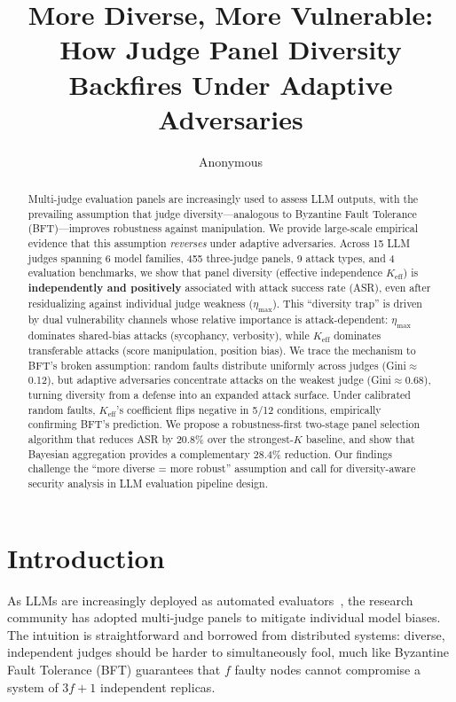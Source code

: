 \documentclass[11pt,a4paper]{article}
\title{More Diverse, More Vulnerable:\\How Judge Panel Diversity Backfires Under Adaptive Adversaries}
\author{Anonymous}
\newcommand{\keff}{K_{\text{eff}}}
\newcommand{\etamax}{\eta_{\text{max}}}
\begin{document}
\maketitle

\begin{abstract}
Multi-judge evaluation panels are increasingly used to assess LLM outputs, with the prevailing assumption that judge diversity---analogous to Byzantine Fault Tolerance (BFT)---improves robustness against manipulation. We provide large-scale empirical evidence that this assumption \emph{reverses} under adaptive adversaries. Across 15 LLM judges spanning 6 model families, 455 three-judge panels, 9 attack types, and 4 evaluation benchmarks, we show that panel diversity (effective independence $\keff$) is \textbf{independently and positively} associated with attack success rate (ASR), even after residualizing against individual judge weakness ($\etamax$). This ``diversity trap'' is driven by dual vulnerability channels whose relative importance is attack-dependent: $\etamax$ dominates shared-bias attacks (sycophancy, verbosity), while $\keff$ dominates transferable attacks (score manipulation, position bias). We trace the mechanism to BFT's broken assumption: random faults distribute uniformly across judges (Gini$\approx$0.12), but adaptive adversaries concentrate attacks on the weakest judge (Gini$\approx$0.68), turning diversity from a defense into an expanded attack surface. Under calibrated random faults, $\keff$'s coefficient flips negative in 5/12 conditions, empirically confirming BFT's prediction. We propose a robustness-first two-stage panel selection algorithm that reduces ASR by 20.8\% over the strongest-$K$ baseline, and show that Bayesian aggregation provides a complementary 28.4\% reduction. Our findings challenge the ``more diverse = more robust'' assumption and call for diversity-aware security analysis in LLM evaluation pipeline design.
\end{abstract}

\section{Introduction}

As LLMs are increasingly deployed as automated evaluators~\cite{zheng2023judging,li2023alpacaeval}, the research community has adopted multi-judge panels to mitigate individual model biases. The intuition is straightforward and borrowed from distributed systems: diverse, independent judges should be harder to simultaneously fool, much like Byzantine Fault Tolerance (BFT) guarantees that $f$ faulty nodes cannot compromise a system of $3f+1$ independent replicas.
\end{document}
